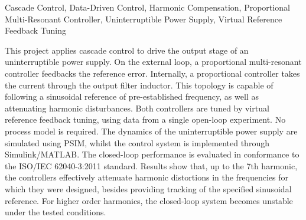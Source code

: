 \documentclass[repeatfields,oneside,overleaf]{tcc}
\begin{document}
\begin{englishabstract}{Cascade Control, Data-Driven Control, Harmonic Compensation, Proportional Multi-Resonant Controller, Uninterruptible Power Supply, Virtual Reference Feedback Tuning}

\noindent
This project applies cascade control to drive the output stage of an uninterruptible power supply.
On the external loop, a proportional multi-resonant controller feedbacks the reference error.
Internally, a proportional controller takes the current through the output filter inductor.
This topology is capable of following a sinusoidal reference of pre-established frequency, as well as attenuating harmonic disturbances.
Both controllers are tuned by virtual reference feedback tuning, using data from a single open-loop experiment.
No process model is required.
The dynamics of the uninterruptible power supply are simulated using PSIM, whilst the control system is implemented through Simulink\slash{}MATLAB.
The closed-loop performance is evaluated in conformance to the ISO\slash{}IEC 62040-3:2011 standard.
Results show that, up to the 7th harmonic, the controllers effectively attenuate harmonic distortions in the frequencies for which they were designed, besides providing tracking of the specified sinusoidal reference.
For higher order harmonics, the closed-loop system becomes unstable under the tested conditions.

\end{englishabstract}




\listoffigures

\listoftables

\end{document}

